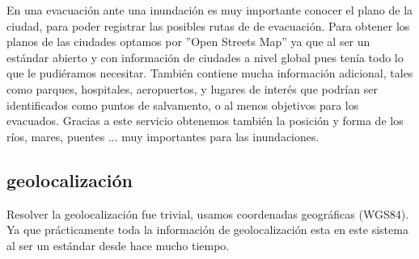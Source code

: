 En una evacuación ante una inundación es muy importante conocer el plano de la ciudad, para poder registrar las posibles rutas de de evacuación.
Para obtener los planos de las ciudades optamos por ''Open Streets Map'' ya que al ser un estándar abierto y con información de ciudades a nivel global pues tenía todo lo que le pudiéramos necesitar. 
También contiene mucha información adicional, tales como parques, hospitales, aeropuertos, y lugares de interés que podrían ser identificados como puntos de salvamento, o al menos objetivos para los evacuados.
Gracias a este servicio obtenemos también la posición y forma de los ríos, mares, puentes ... muy importantes para las inundaciones. 

\subsection*{geolocalización}

Resolver la geolocalización fue trivial, usamos coordenadas geográficas (WGS84). Ya que prácticamente toda la información de geolocalización esta en este sistema al ser un estándar desde hace mucho tiempo.
